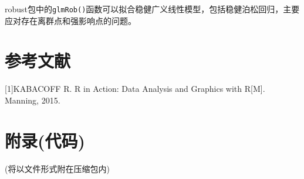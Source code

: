 \documentclass[
]{article}
\begin{document}
robust包中的\texttt{glmRob()}函数可以拟合稳健广义线性模型，包括稳健泊松回归，主要应对存在离群点和强影响点的问题。

\hypertarget{ux53c2ux8003ux6587ux732e}{%
\section{参考文献}\label{ux53c2ux8003ux6587ux732e}}

{[}1{]}KABACOFF R. R in Action: Data Analysis and Graphics with
R{[}M{]}. Manning, 2015.

\hypertarget{ux9644ux5f55ux4ee3ux7801}{%
\section{附录(代码)}\label{ux9644ux5f55ux4ee3ux7801}}

(将以文件形式附在压缩包内)
\end{document}
